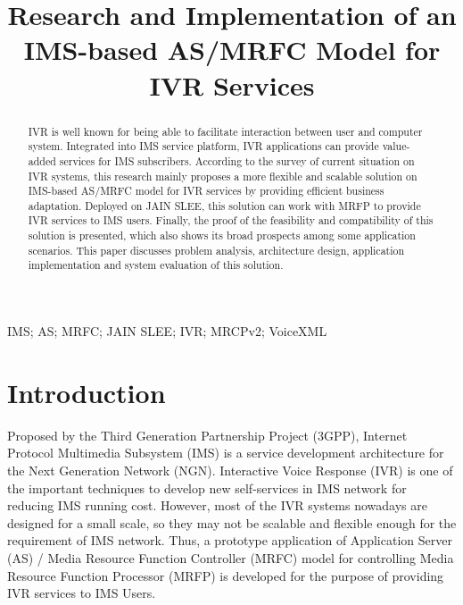 \documentclass[10pt, conference, a4paper]{IEEEtran}
\begin{document}
\title{Research and Implementation of an IMS-based AS/MRFC Model for IVR Services}


\author{
}

\maketitle


\begin{abstract}
IVR is well known for being able to facilitate interaction between user and computer system. Integrated into IMS service platform, IVR applications can provide value-added services for IMS subscribers. According to the survey of current situation on IVR systems, this research mainly proposes a more flexible and scalable solution on IMS-based AS/MRFC model for IVR services by providing efficient business adaptation. Deployed on JAIN SLEE, this solution can work with MRFP to provide IVR services to IMS users. Finally, the proof of the feasibility and compatibility of this solution is presented, which also shows its broad prospects among some application scenarios. This paper discusses problem analysis, architecture design, application implementation and system evaluation of this solution.

\end{abstract}

\begin{IEEEkeywords}
IMS; AS; MRFC; JAIN SLEE; IVR; MRCPv2; VoiceXML

\end{IEEEkeywords}

\IEEEpeerreviewmaketitle

\section{Introduction}
Proposed by the Third Generation Partnership Project (3GPP), Internet Protocol Multimedia Subsystem (IMS) is a service development architecture for the Next Generation Network (NGN)\cite{standard:3gpp.23.228}. Interactive Voice Response (IVR) is one of the important techniques to develop new self-services in IMS network for reducing IMS running cost. However, most of the IVR systems nowadays are designed for a small scale, so they may not be scalable and flexible enough for the requirement of IMS network. Thus, a prototype application of Application Server (AS) / Media Resource Function Controller (MRFC) model for controlling Media Resource Function Processor (MRFP) is developed for the purpose of providing IVR services to IMS Users. 
\end{document}
